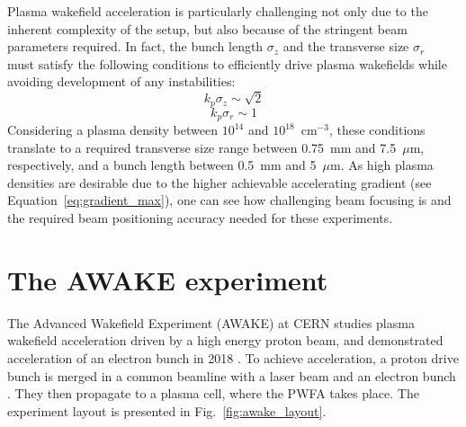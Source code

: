 Plasma wakefield acceleration is particularly challenging not only due to the inherent complexity of the setup, but also because of the stringent beam parameters required. In fact, the bunch length $\sigma_z$ \cite{limits_plasma_acceleration} and the transverse size $\sigma_r$~\cite{PhysRevLett.109.185007} must satisfy the following conditions to efficiently drive plasma wakefields while avoiding development of any instabilities:
\begin{equation}
k_p\sigma_z\sim\sqrt{2}\label{eq:lim_long}
\end{equation}
\begin{equation}
k_p\sigma_r\sim1\label{eq:lim_trans}
\end{equation}
Considering a plasma density between $10^{14}$ and $10^{18}$~cm$^{-3}$, these conditions translate to a required transverse size range between 0.75~mm and 7.5~$\mu$m, respectively, and a bunch length between 0.5~mm and 5~$\mu$m. As high plasma densities are desirable due to the higher achievable accelerating gradient (see Equation~\ref{eq:gradient_max}), one can see how challenging beam focusing is and the required beam positioning accuracy needed for these experiments. 









\section[The AWAKE experiment]{The AWAKE experiment}

The Advanced Wakefield Experiment (AWAKE) at CERN studies plasma wakefield acceleration driven by a high energy proton beam, and demonstrated acceleration of an electron bunch in 2018 \cite{Adli:2018end}. To achieve acceleration, a proton drive bunch is merged in a common beamline with a laser beam and an electron bunch \cite{Bracco:1965994}. They then propagate to a plasma cell, where the PWFA takes place. The experiment layout is presented in Fig.~\ref{fig:awake_layout}.

